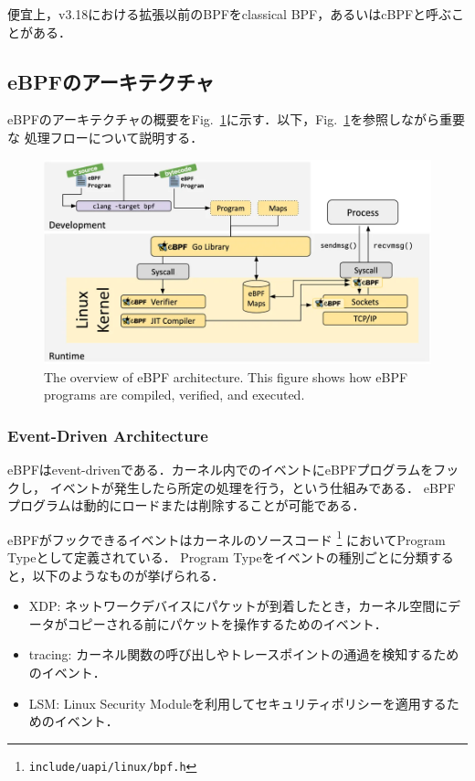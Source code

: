 \documentclass[platex,a4j,10pt,twoside,twocolumn,dvipdfmx]{jsarticle}
\newcommand{\Fref}[1]{Fig.~\ref{#1}}
\begin{document}
    便宜上，v3.18における拡張以前のBPFをclassical BPF，あるいはcBPFと呼ぶことがある．
  
  \subsection{eBPFのアーキテクチャ}
    eBPFのアーキテクチャの概要を\Fref{img:ebpf-system}に示す．以下，\Fref{img:ebpf-system}を参照しながら重要な
    処理フローについて説明する．
    \begin{figure}[tp]
      \begin{center}
        \includegraphics[width=\columnwidth]{./img/ebpf_system.png}
      \end{center}
      \caption{The overview of eBPF architecture. This figure shows how eBPF programs are compiled, verified, and executed.
      \cite{WhatiseB29:online}}
      \label{img:ebpf-system}
    \end{figure}

    \subsubsection{Event-Driven Architecture}
    eBPFはevent-drivenである．カーネル内でのイベントにeBPFプログラムをフックし，
    イベントが発生したら所定の処理を行う，という仕組みである．
    eBPFプログラムは動的にロードまたは削除することが可能である．
    
    eBPFがフックできるイベントはカーネルのソースコード \footnote{\texttt{include/uapi/linux/bpf.h}} においてProgram Typeとして定義されている．
    Program Typeをイベントの種別ごとに分類すると，以下のようなものが挙げられる．
    \begin{itemize}
      \item XDP: ネットワークデバイスにパケットが到着したとき，カーネル空間にデータがコピーされる前にパケットを操作するためのイベント．
      \item tracing: カーネル関数の呼び出しやトレースポイントの通過を検知するためのイベント．
      \item LSM: Linux Security Moduleを利用してセキュリティポリシーを適用するためのイベント．
    \end{itemize}
    
\end{document}
